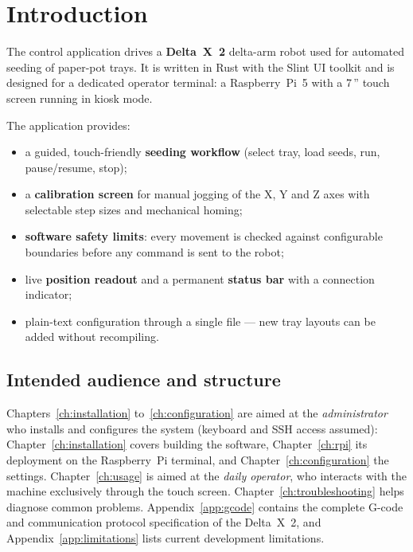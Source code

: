 \chapter{Introduction}

The \appname{} control application drives a \textbf{Delta~X~2} delta-arm robot used
for automated seeding of paper-pot trays. It is written in Rust with the Slint UI
toolkit and is designed for a dedicated operator terminal: a Raspberry~Pi~5 with a
7\,'' touch screen running in kiosk mode.

The application provides:

\begin{itemize}[itemsep=2pt]
  \item a guided, touch-friendly \textbf{seeding workflow} (select tray, load seeds,
        run, pause/resume, stop);
  \item a \textbf{calibration screen} for manual jogging of the X, Y and Z axes with
        selectable step sizes and mechanical homing;
  \item \textbf{software safety limits}: every movement is checked against configurable
        boundaries before any command is sent to the robot;
  \item live \textbf{position readout} and a permanent \textbf{status bar} with a
        connection indicator;
  \item plain-text configuration through a single  file --- new tray
        layouts can be added without recompiling.
\end{itemize}

\section{Intended audience and structure}

Chapters~\ref{ch:installation} to~\ref{ch:configuration} are aimed at the
\emph{administrator} who installs and configures the system (keyboard and SSH access
assumed): Chapter~\ref{ch:installation} covers building the software,
Chapter~\ref{ch:rpi} its deployment on the Raspberry~Pi terminal, and
Chapter~\ref{ch:configuration} the  settings.
Chapter~\ref{ch:usage} is aimed at the \emph{daily operator}, who interacts with the
machine exclusively through the touch screen.
Chapter~\ref{ch:troubleshooting} helps diagnose common problems.
Appendix~\ref{app:gcode} contains the complete G-code and communication protocol
specification of the Delta~X~2, and Appendix~\ref{app:limitations} lists current
development limitations.

